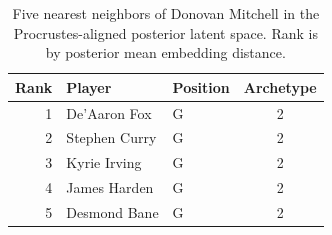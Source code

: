 \begin{table}[htbp]
  \centering\small
  \begin{tabular}{rllc}
    \toprule
    Rank & Player & Position & Archetype \\
    \midrule
    1 & De'Aaron Fox & G & 2 \\
    2 & Stephen Curry & G & 2 \\
    3 & Kyrie Irving & G & 2 \\
    4 & James Harden & G & 2 \\
    5 & Desmond Bane & G & 2 \\
    \bottomrule
  \end{tabular}
  \caption{Five nearest neighbors of Donovan Mitchell in the Procrustes-aligned posterior latent space. Rank is by posterior mean embedding distance.}
  \label{tab:Donovan_Mitchell_neighbors}
\end{table}

